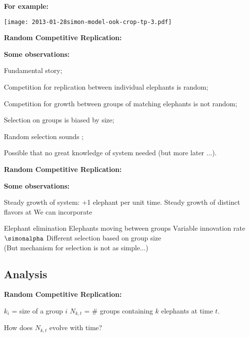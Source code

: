   \textbf{For example:}

  
    \texttt{[image: 2013-01-28simon-model-ook-crop-tp-3.pdf]}
  
  

  \textbf{Random Competitive Replication:}

  \textbf{Some observations:}
  
   
    Fundamental  story;
   
    Competition for replication between individual elephants is random;
   
    Competition for growth between groups of matching elephants is not random;
   
    Selection on groups is biased by size;
   
    Random selection sounds ;
   
    Possible that no great knowledge of system needed (but more later ...).
  
  



  \textbf{Random Competitive Replication:}

  \textbf{Some observations:}
  
   Steady growth of system: +1 elephant per unit time.
   Steady growth of distinct flavors at 
   We can incorporate 
    
     Elephant elimination
     Elephants moving between groups
     Variable innovation rate $\simonalpha$
     Different selection based on group size\\
      {(But mechanism for selection is not as simple...)}
    
  
  


\subsection{Analysis}

  \textbf{Random Competitive Replication:}

  
  
     $k_i$ = size of a group $i$
     $N_{k,t}$ = \# groups containing $k$ elephants at time $t$.
  

  \bigskip

  { How does $N_{k,t}$ evolve with time?}

  \bigskip

